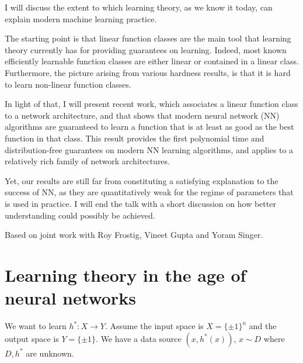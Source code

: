 \def\filepath{C:/Users/oldhe/Dropbox/Math/templates}






\pagestyle{fancy}
\chead{} 
\rhead{} 
\lfoot{} 
\cfoot{\thepage} 
\rfoot{} 
\renewcommand{\headrulewidth}{.3pt} 
\setlength\voffset{0in}
\setlength\textheight{648pt}





I will discuss the extent to which learning theory, as we know it
today, can explain modern machine learning practice.

The starting point is that linear function classes are the main tool
that learning theory currently has for providing guarantees on
learning. Indeed, most known efficiently learnable function classes
are either linear or contained in a linear class. Furthermore, the
picture arising from various hardness results, is that it is hard to
learn non-linear function classes.

In light of that, I will present recent work, which associates a
linear function class to a network architecture, and that shows that
modern neural network (NN) algorithms are guaranteed to learn a
function that is at least as good as the best function in that class.
This result provides the first polynomial time and distribution-free
guarantees on modern NN learning algorithms, and applies to a
relatively rich family of network architectures.

Yet, our results are still far from constituting a satisfying
explanation to the success of NN, as they are quantitatively weak for
the regime of parameters that is used in practice. I will end the talk
with a short discussion on how better understanding could possibly be
achieved.


Based on joint work with Roy Frostig, Vineet Gupta and Yoram Singer.
\section{Learning theory in the age of neural networks}

We want to learn $h^*:X\to Y$.
Assume the input space is $X=\{\pm 1\}^n$ and the output space is $Y=\{\pm 1\}$.  We have a data source $(x,h^*(x))$, $x\sim D$ where $D,h^*$ are unknown.

